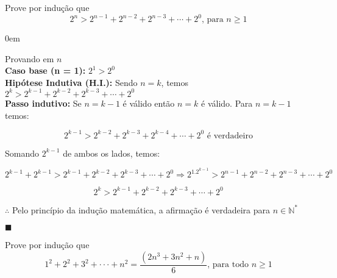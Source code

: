 \documentclass[12pt]{article}
\newcommand{\N}{\mathbb{N}}
\renewcommand{\qed}{\hfill$\blacksquare$}
\renewenvironment{proof}{\begin{addmargin}[1em]{0em}\begin{newproof}}{\end{newproof}\end{addmargin}\qed}
\newenvironment{problem}[2][Problema]{\begin{trivlist}
\item[\hskip \labelsep {\bfseries #1}\hskip \labelsep {\bfseries #2.}]}{\end{trivlist}}
\begin{document}
 

 
 
\begin{problem}{1}
Prove por indução que $$2^n > 2^{n-1} + 2^{n-2} + 2^{n-3} + \cdots + 2^0 \text{, para } n \ge 1$$
\end{problem}

\begin{proof}
    Provando em $n$ \\
    \textbf{Caso base (n = 1):  } $2^1 > 2^0$ \\
    \textbf{Hipótese Indutiva (H.I.): } Sendo $n=k$, temos $2^k > 2^{k-1} + 2^{k-2} + 2^{k-3} + \cdots + 2^0$ \\
    \textbf{Passo indutivo: } Se $n = k-1$ é válido então $n = k$ é válido. Para $n = k-1$ temos:
    
    $$2^{k-1} > 2^{k-2} + 2^{k-3} + 2^{k-4} + \cdots + 2^0 \text{ é verdadeiro}$$

    Somando $2^{k-1}$ de ambos os lados, temos:

    $$2^{k-1} + 2^{k-1} > 2^{k-1} + 2^{k-2} + 2^{k-3} + \cdots + 2^0 \Longrightarrow 2^1.2^{k-1} > 2^{n-1} + 2^{n-2} + 2^{n-3} + \cdots + 2^0$$

    \begin{equation*}
        \boxed{2^{k} > 2^{k-1} + 2^{k-2} + 2^{k-3} + \cdots + 2^0}
    \end{equation*}

    $\therefore$ Pelo princípio da indução matemática, a afirmação é verdadeira para $n \in \N^*$
\end{proof}

\begin{problem}{2}
    Prove por indução que $$1^2 + 2^2 + 3^2 + ··· + n^2 = \frac{(2n^3 + 3n^2 + n)}{6} \text{, para todo } n \ge 1$$
\end{problem}
\end{document}
